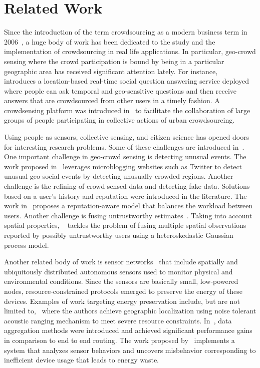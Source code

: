 \documentclass{acm_proc_article-sp}
\begin{document}
\section{Related Work}
Since the introduction of the term crowdsourcing as a modern business term in 2006~\cite{howe2006rise}, a huge body of work has been dedicated to the study and the implementation of crowdsourcing in real life applications. In particular, geo-crowd sensing where the crowd participation is bound by being in a particular geographic area has received significant attention lately. For instance, ~\cite{liu2013using} introduces a location-based real-time social question answering service deployed where people can ask temporal and geo-sensitive questions and then receive answers that are crowdsourced from other users in a timely fashion. A crowdsensing platform was introduced in~\cite{cardone2013fostering} to facilitate the collaboration of large groups of people participating in collective actions of urban crowdsourcing.\par
Using people as sensors, collective sensing, and citizen science has opened doors for interesting research problems. Some of these challenges are introduced in~\cite{blaschke2011collective}. One important challenge in geo-crowd sensing is detecting unusual events. The work proposed in~\cite{lee2010measuring} leverages microblogging websites such as Twitter to detect unusual geo-social events by detecting unusually crowded regions. Another challenge is the refining of crowd sensed data and detecting fake data. Solutions based on a user's history and reputation were introduced in the literature. The work in~\cite{yu2013reputation} proposes a reputation-aware model that balances the workload between users. Another challenge is fusing untrustworthy estimates~\cite{venanzi2013trust}. Taking into account spatial properties, ~\cite{venanzi2013crowdsourcing} tackles the problem of fusing multiple spatial observations reported by possibly untrustworthy users using a heteroskedastic Gaussian process model.\par
Another related body of work is sensor networks~\cite{akyildiz2002survey} that include spatially and ubiquitously distributed autonomous sensors used to monitor physical and environmental conditions. Since the sensors are basically small, low-powered nodes, resource-constrained protocols emerged to preserve the energy of these devices. Examples of work targeting energy preservation include, but are not limited to,~\cite{sallai2004acoustic} where the authors achieve geographic localization using noise tolerant acoustic ranging mechanism to meet severe resource constraints. In~\cite{krishnamachari2002impact}, data aggregation methods were introduced and achieved significant performance gains in comparison to end to end routing. The work proposed by~\cite{fontugne2013strip} implements a system that analyzes sensor behaviors and uncovers misbehavior corresponding to inefficient device usage that leads to energy waste.
\end{document}
